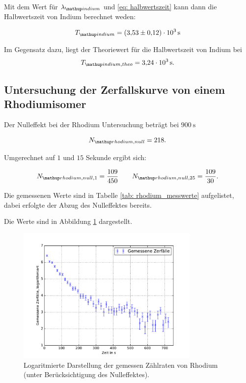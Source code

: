 Mit dem Wert für $\lambda\ua{indium}$ und \eqref{eq: halbwertszeit} kann dann die Halbwertszeit von Indium
berechnet weden:

\begin{equation}
  \label{eq:halbwertzeit_indium}
  T\ua{indium}=\SI{3.53\pm0.12 e+3}{\second}
\end{equation}

Im Gegensatz dazu, liegt der Theoriewert für die Halbwertszeit von Indium\cite{indium_halb} bei
\begin{equation}
  \label{eq:halbwertzeit_indium_theo}
  T\ua{indium,theo}=\SI{3.24 e+3}{\second}.
\end{equation}

\subsection{Untersuchung der Zerfallskurve von einem Rhodiumisomer}

Der Nulleffekt bei der Rhodium Untersuchung beträgt bei $\SI{900}{\second}$

\begin{equation*}
  N\ua{rhodium,null}=218.
\end{equation*}

Umgerechnet auf $1$ und $15$ Sekunde ergibt sich:

\begin{equation*}
    N\ua{rhodium,null,1}=\frac{109}{450} \qquad N\ua{rhodium,null,25}=\frac{109}{30}.
\end{equation*}

Die gemessenen Werte sind in Tabelle \ref{tab: rhodium_messwerte} aufgelistet, dabei erfolgte
der Abzug des Nulleffektes bereits.


Die Werte sind in Abbildung \ref{fig: plot_rhodium} dargestellt.

\begin{figure}
  \centering
  \includegraphics[width=0.8\textwidth]{pics/ra_all.pdf}
  \caption{Logaritmierte Darstellung der gemessen Zählraten von Rhodium (unter Berücksichtigung des Nulleffektes).}
  \label{fig: plot_rhodium}
\end{figure}




